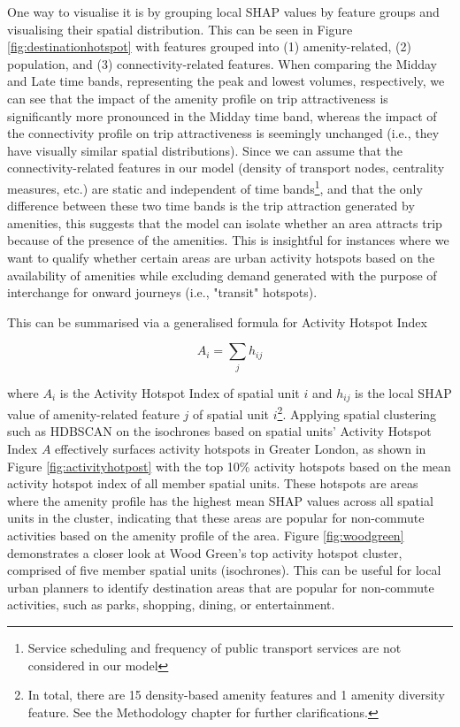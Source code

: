 One way to visualise it is by grouping local SHAP values by feature groups and visualising their spatial distribution. This can be seen in Figure \ref{fig:destinationhotspot} with features grouped into (1) amenity-related, (2) population, and (3) connectivity-related features. When comparing the Midday and Late time bands, representing the peak and lowest volumes, respectively, we can see that the impact of the amenity profile on trip attractiveness is significantly more pronounced in the Midday time band, whereas the impact of the connectivity profile on trip attractiveness is seemingly unchanged (i.e., they have visually similar spatial distributions). Since we can assume that the connectivity-related features in our model (density of transport nodes, centrality measures, etc.) are static and independent of time bands\footnote{Service scheduling and frequency of public transport services are not considered in our model}, and that the only difference between these two time bands is the trip attraction generated by amenities, this suggests that the model can isolate whether an area attracts trip because of the presence of the amenities. This is insightful for instances where we want to qualify whether certain areas are urban activity hotspots based on the availability of amenities while excluding demand generated with the purpose of interchange for onward journeys (i.e., "transit" hotspots). 

\pagebreak
\noindent This can be summarised via a generalised formula for Activity Hotspot Index

$$A_i = \sum_{j} h_{ij}$$

\noindent where $A_i$ is the Activity Hotspot Index of spatial unit $i$ and $h_{ij}$ is the local SHAP value of amenity-related feature $j$ of spatial unit $i$\footnote{In total, there are 15 density-based amenity features and 1 amenity diversity feature. See the Methodology chapter for further clarifications.}. Applying spatial clustering such as HDBSCAN on the isochrones based on spatial units' Activity Hotspot Index $A$ effectively surfaces activity hotspots in Greater London, as shown in Figure \ref{fig:activityhotpost} with the top 10\% activity hotspots based on the mean activity hotspot index of all member spatial units. These hotspots are areas where the amenity profile has the highest mean SHAP values across all spatial units in the cluster, indicating that these areas are popular for non-commute activities based on the amenity profile of the area. Figure \ref{fig:woodgreen} demonstrates a closer look at Wood Green's top activity hotspot cluster, comprised of five member spatial units (isochrones). This can be useful for local urban planners to identify destination areas that are popular for non-commute activities, such as parks, shopping, dining, or entertainment.

